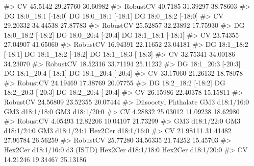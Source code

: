 \documentclass[
  letterpaper,
  DIV=11,
  numbers=noendperiod]{scrreprt}
\newenvironment{Shaded}{\begin{snugshade}}{\end{snugshade}}
\newcommand{\CommentTok}[1]{\textcolor[rgb]{0.37,0.37,0.37}{#1}}
\begin{document}
\begin{Shaded}
\begin{Highlighting}[]
\CommentTok{\#\textgreater{} CV                    45.5142             29.27760             30.60982}
\CommentTok{\#\textgreater{} RobustCV              40.7185             31.39297             38.78603}
\CommentTok{\#\textgreater{}          DG 18:0\_18:1 [{-}18:0] DG 18:0\_18:1 [{-}18:1] DG 18:0\_18:2 [{-}18:0]}
\CommentTok{\#\textgreater{} CV                   29.20332             34.44538             27.87783}
\CommentTok{\#\textgreater{} RobustCV             25.52857             32.23892             17.75930}
\CommentTok{\#\textgreater{}          DG 18:0\_18:2 [{-}18:2] DG 18:0\_20:4 [{-}20:4] DG 18:1\_18:1 [{-}18:1]}
\CommentTok{\#\textgreater{} CV                   23.74355             27.04907             41.65060}
\CommentTok{\#\textgreater{} RobustCV             16.94391             22.11652             23.04181}
\CommentTok{\#\textgreater{}          DG 18:1\_18:2 [{-}18:1] DG 18:1\_18:2 [{-}18:2] DG 18:1\_18:3 [{-}18:3]}
\CommentTok{\#\textgreater{} CV                   32.75341             34.00186             34.23070}
\CommentTok{\#\textgreater{} RobustCV             18.52316             33.71194             25.11232}
\CommentTok{\#\textgreater{}          DG 18:1\_20:3 [{-}20:3] DG 18:1\_20:4 [{-}18:1] DG 18:1\_20:4 [{-}20:4]}
\CommentTok{\#\textgreater{} CV                   33.17060             21.26132             18.78078}
\CommentTok{\#\textgreater{} RobustCV             24.19469             17.38769             20.07755}
\CommentTok{\#\textgreater{}          DG 18:2\_18:2 [{-}18:2] DG 18:2\_20:3 [{-}20:3] DG 18:2\_20:4 [{-}20:4]}
\CommentTok{\#\textgreater{} CV                   26.15986             22.40378             15.15811}
\CommentTok{\#\textgreater{} RobustCV             24.56809             23.52355             20.07444}
\CommentTok{\#\textgreater{}          Diisooctyl Phthalate GM3 d18:1/16:0 GM3 d18:1/18:0 GM3 d18:1/20:0}
\CommentTok{\#\textgreater{} CV                    4.28832       25.03012       11.09238       18.62980}
\CommentTok{\#\textgreater{} RobustCV              4.05493       12.82206       10.04107       21.73299}
\CommentTok{\#\textgreater{}          GM3 d18:1/22:0 GM3 d18:1/24:0 GM3 d18:1/24:1 Hex2Cer d18:1/16:0}
\CommentTok{\#\textgreater{} CV             21.98111       31.41482       27.96784           26.56259}
\CommentTok{\#\textgreater{} RobustCV       25.77280       34.56335       21.74252           15.45703}
\CommentTok{\#\textgreater{}          Hex2Cer d18:1/16:0 d3 (ISTD) Hex2Cer d18:1/18:0 Hex2Cer d18:1/20:0}
\CommentTok{\#\textgreater{} CV                           14.21246           19.34467           25.13186}

\end{Highlighting}
\end{Shaded}
\end{document}
